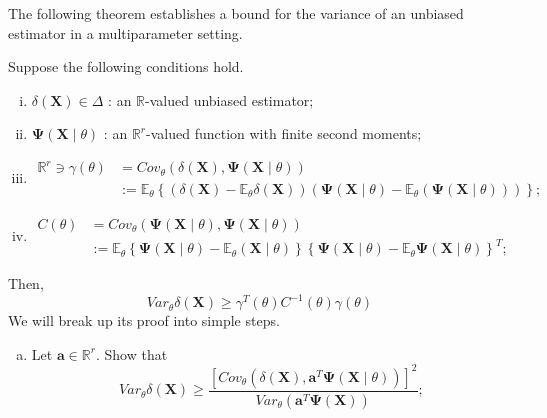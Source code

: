 \begin{ex}
    The following theorem establishes a bound for the variance of an unbiased estimator in a multiparameter setting. 

    Suppose the following conditions hold. 
    \begin{enumerate}[(i)]
        \item \(\delta(\boldsymbol{X}) \in \Delta\) : an \(\mathbb{R}\)-valued unbiased estimator; 
        \item \(\boldsymbol{\Psi}(\boldsymbol{X} \mid \theta)\) : an \(\mathbb{R}^{r}\)-valued function with finite second moments; 
        \item \[
        \begin{aligned}
            \mathbb{R}^{r} \ni \gamma(\theta) &= Cov_{\theta}(\delta(\boldsymbol{X}), \boldsymbol{\Psi}(\boldsymbol{X} \mid \theta))\\
            &:=\mathbb{E}_{\theta}\left\{\left(\delta(\boldsymbol{X})-\mathbb{E}_{\theta} \delta(\boldsymbol{X})\right)\left(\boldsymbol{\Psi}(\boldsymbol{X} \mid \theta)-\mathbb{E}_{\theta}(\boldsymbol{\Psi}(\boldsymbol{X} \mid \theta))\right)\right\};
        \end{aligned}
        \]
        \item \[
            \begin{aligned}
                C(\theta) &= Cov_{\theta}(\boldsymbol{\Psi}(\boldsymbol{X} \mid \theta), \boldsymbol{\Psi}(\boldsymbol{X} \mid \theta))\\
                &:=\mathbb{E}_{\theta}\left\{\boldsymbol{\Psi}(\boldsymbol{X} \mid \theta)-\mathbb{E}_{\theta}(\boldsymbol{X} \mid \theta)\right\}\left\{\boldsymbol{\Psi}(\boldsymbol{X} \mid \theta)-\mathbb{E}_{\theta} \boldsymbol{\Psi}(\boldsymbol{X} \mid \theta)\right\}^T; 
            \end{aligned}
        \]
    \end{enumerate}
    Then,
        \[
            Var_{\theta} \delta(\boldsymbol{X}) \geq \gamma^T(\theta) C^{-1}(\theta) \gamma(\theta)
        \]
    We will break up its proof into simple steps. 
        \begin{enumerate}[(a)]
            \item Let \(\mathbf{a} \in \mathbb{R}^{r}\). Show that 
            \[
                Var_{\theta} \delta(\mathbf{X}) \geq \frac{\left[ Cov_{\theta}\left(\delta(\mathbf{X}), \mathbf{a}^T \boldsymbol{\Psi}(\mathbf{X} \mid \theta)\right)\right]^{2}}{ Var_{\theta}\left(\mathbf{a}^T \boldsymbol{\Psi}(\mathbf{X})\right)}; 
\]
\end{enumerate}
\end{ex}
